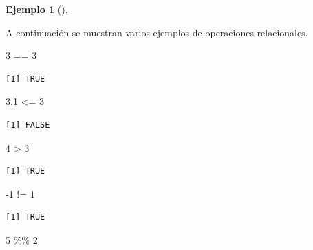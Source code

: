 \documentclass[
  a4paper,
]{scrreport}
\newenvironment{Shaded}{\begin{snugshade}}{\end{snugshade}}
\newcommand{\DecValTok}[1]{\textcolor[rgb]{0.68,0.00,0.00}{#1}}
\newcommand{\FloatTok}[1]{\textcolor[rgb]{0.68,0.00,0.00}{#1}}
\newcommand{\SpecialCharTok}[1]{\textcolor[rgb]{0.37,0.37,0.37}{#1}}
\theoremstyle{definition}
\newtheorem{example}{Ejemplo}[chapter]
\theoremstyle{definition}
\theoremstyle{remark}
\begin{document}
\leavevmode{}%
\begin{example}[]\label{exm-operadores-relacionales}

A continuación se muestran varios ejemplos de operaciones relacionales.

\begin{Shaded}
\begin{Highlighting}[]
\DecValTok{3} \SpecialCharTok{==} \DecValTok{3}
\end{Highlighting}
\end{Shaded}

\begin{verbatim}
[1] TRUE
\end{verbatim}

\begin{Shaded}
\begin{Highlighting}[]
\FloatTok{3.1} \SpecialCharTok{\textless{}=} \DecValTok{3}
\end{Highlighting}
\end{Shaded}

\begin{verbatim}
[1] FALSE
\end{verbatim}

\begin{Shaded}
\begin{Highlighting}[]
\DecValTok{4} \SpecialCharTok{\textgreater{}} \DecValTok{3}
\end{Highlighting}
\end{Shaded}

\begin{verbatim}
[1] TRUE
\end{verbatim}

\begin{Shaded}
\begin{Highlighting}[]
\SpecialCharTok{{-}}\DecValTok{1} \SpecialCharTok{!=} \DecValTok{1}
\end{Highlighting}
\end{Shaded}

\begin{verbatim}
[1] TRUE
\end{verbatim}

\begin{Shaded}
\begin{Highlighting}[]
\DecValTok{5} \SpecialCharTok{\%\%} \DecValTok{2}
\end{Highlighting}
\end{Shaded}


\end{example}
\end{document}

